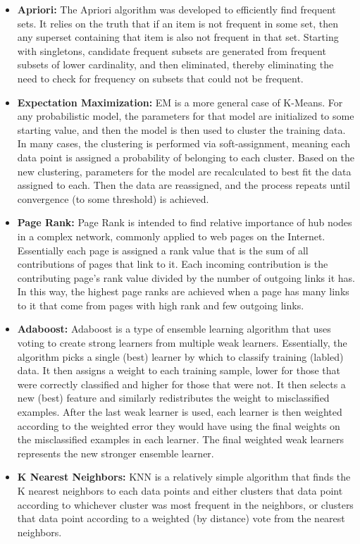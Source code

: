 \documentclass[fleqn,10pt]{SelfArx} %
\begin{document}
\begin{itemize}
	\item{\textbf{Apriori:}} The Apriori algorithm was developed to efficiently find frequent sets.  It relies on the truth that if an item is not frequent in some set, then any superset containing that item is also not frequent in that set.  Starting with singletons, candidate frequent subsets are generated from frequent subsets of lower cardinality, and then eliminated, thereby eliminating the need to check for frequency on subsets that could not be frequent.
	\item{\textbf{Expectation Maximization:}} EM is a more general case of K-Means.  For any probabilistic model, the parameters for that model are initialized to some starting value, and then the model is then used to cluster the training data.  In many cases, the clustering is performed via soft-assignment, meaning each data point is assigned a probability of belonging to each cluster.  Based on the new clustering, parameters for the model are recalculated to best fit the data assigned to each.  Then the data are reassigned, and the process repeats until convergence (to some threshold) is achieved.
	\item{\textbf{Page Rank:}} Page Rank is intended to find relative importance of hub nodes in a complex network, commonly applied to web pages on the Internet.  Essentially each page is assigned a rank value that is the sum of all contributions of pages that link to it.  Each incoming contribution is the contributing page's rank value divided by the number of outgoing links it has.  In this way, the highest page ranks are achieved when a page has many links to it that come from pages with high rank and few outgoing links.
	\item{\textbf{Adaboost:}} Adaboost is a type of ensemble learning algorithm that uses voting to create strong learners from multiple weak learners.  Essentially, the algorithm picks a single (best) learner by which to classify training (labled) data.  It then assigns a weight to each training sample, lower for those that were correctly classified and higher for those that were not.  It then selects a new (best) feature and similarly redistributes the weight to misclassified examples.  After the last weak learner is used, each learner is then weighted according to the weighted error they would have using the final weights on the misclassified examples in each learner.  The final weighted weak learners represents the new stronger ensemble learner.
	\item{\textbf{K Nearest Neighbors:}} KNN is a relatively simple algorithm that finds the K nearest neighbors to each data points and either clusters that data point according to whichever cluster was most frequent in the neighbors, or clusters that data point according to a weighted (by distance) vote from the nearest neighbors.

\end{itemize}
\end{document}
